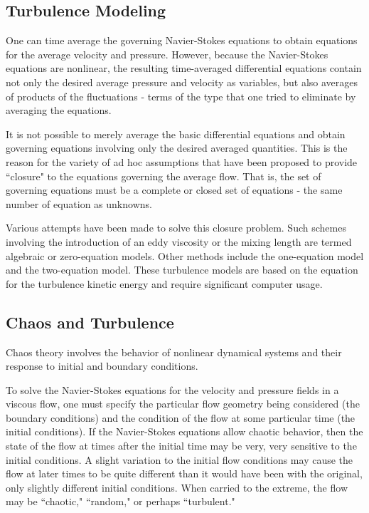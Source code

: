 \documentclass[12pt,a4paper]{article}
\newcounter{theo}[section]\setcounter{theo}{0}
\begin{document}
\subsection{Turbulence Modeling}
\cite{munson2009fundamentals, munson2012fundamentals} One can time average the governing Navier-Stokes equations to obtain equations for the average velocity and pressure. However, because the Navier-Stokes equations are nonlinear, the resulting time-averaged differential equations contain not only the desired average pressure and velocity as variables, but also averages of products of the fluctuations - terms of the type that one tried to eliminate by averaging the equations. 

It is not possible to merely average the basic differential equations and obtain governing equations involving only the desired averaged quantities. This is the reason for the variety of ad hoc assumptions that have been proposed to provide ``closure" to the equations governing the average flow. That is, the set of governing equations must be a complete or closed set of equations - the same number of equation as unknowns.

Various attempts have been made to solve this closure problem. Such schemes involving the introduction of an eddy viscosity or the mixing length are termed algebraic or zero-equation models. Other methods include the one-equation model and the two-equation model. These turbulence models are based on the equation for the turbulence kinetic energy and require significant computer usage.


\subsection{Chaos and Turbulence}
\cite{munson2009fundamentals, munson2012fundamentals} Chaos theory involves the behavior of nonlinear dynamical systems and their response to initial and boundary conditions. 

To solve the Navier-Stokes equations for the velocity and pressure fields in a viscous flow, one must specify the particular flow geometry being considered (the boundary conditions) and the condition of the flow at some particular time (the initial conditions). If the Navier-Stokes equations allow chaotic behavior, then the state of the flow at times after the initial time may be very, very sensitive to the initial conditions. A slight variation to the initial flow conditions may cause the flow at later times to be quite different than it would have been with the original, only slightly different initial conditions. When carried to the extreme, the flow may be ``chaotic," ``random," or perhaps ``turbulent."
\end{document}
